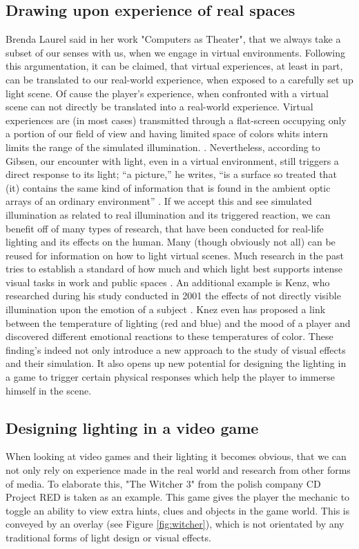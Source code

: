 \subsection{Drawing upon experience of real spaces}
Brenda Laurel said in her work "Computers as Theater", that we always take a subset of our senses with us, when we engage in virtual environments. Following this argumentation, it can be claimed, that virtual experiences, at least in part, can be translated to our real-world experience, when exposed to a carefully set up light scene. Of cause the player's experience, when confronted with a virtual scene can not directly be translated into a real-world experience. Virtual experiences are  (in most cases) transmitted through a flat-screen occupying only a portion of our field of view and having limited space of colors whits intern limits the range of the simulated illumination. \cite{Niedenthal1404353}. Nevertheless, according to Gibsen, our encounter with light, even in a virtual environment, still triggers a direct response to its light; “a picture,” he writes, “is a surface so treated that (it) contains the same kind of information that is found in the ambient optic arrays of an ordinary environment” \cite{Gibson71}.
If we accept this and see simulated illumination as related to real illumination and its triggered reaction, we can benefit off of many types of research, that have been conducted for real-life lighting and its effects on the human. Many (though obviously not all) can be reused for information on how to light virtual scenes. Much research in the past tries to establish a standard of how much and which light best supports intense visual tasks in work and public spaces \cite{Niedenthal1404353}. An additional example is Kenz, who researched during his study conducted in 2001 the effects of not directly visible illumination upon the emotion of a subject \cite{Knez2001}. Knez even has proposed a link between the temperature of lighting (red and blue) and the mood of a player and discovered different emotional reactions to these temperatures of color. These finding's indeed not only introduce a new approach to the study of visual effects and their simulation. It also opens up new potential for designing the lighting in a game to trigger certain physical responses which help the player to immerse himself in the scene. 
\newpage
\subsection{Designing lighting in a video game}
\label{chap:witcher}
When looking at video games and their lighting it becomes obvious, that we can not only rely on experience made in the real world and research from other forms of media. To elaborate this, "The Witcher 3" from the polish company CD Project RED is taken as an example. This game gives the player the mechanic to toggle an ability to view extra hints, clues and objects in the game world. This is conveyed by an overlay (see Figure \ref{fig:witcher}), which is not orientated by any traditional forms of light design or visual effects. \cite{witchersenses}

